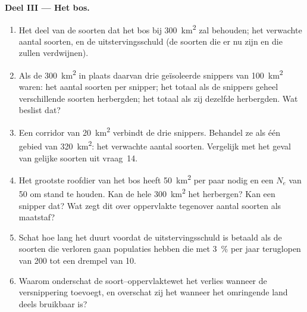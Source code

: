 \begin{problem}
\medskip
\noindent\textbf{Deel III --- Het bos.}
\begin{enumerate}[resume]
  \item Het deel van de soorten dat het bos bij \qty{300}{km^2} zal
        behouden; het verwachte aantal soorten, en de uitstervingsschuld
        (de soorten die er nu zijn en die zullen verdwijnen).
  \item Als de \qty{300}{km^2} in plaats daarvan drie geïsoleerde
        snippers van \qty{100}{km^2} waren: het aantal soorten per
        snipper; het totaal als de snippers geheel verschillende
        soorten herbergden; het totaal als zij dezelfde herbergden. Wat
        beslist dat?
  \item Een corridor van \qty{20}{km^2} verbindt de drie snippers.
        Behandel ze als één gebied van \qty{320}{km^2}: het verwachte
        aantal soorten. Vergelijk met het geval van gelijke soorten uit
        vraag~14.
  \item Het grootste roofdier van het bos heeft \qty{50}{km^2} per paar
        nodig en een $N_{e}$ van 50 om stand te houden. Kan de hele
        \qty{300}{km^2} het herbergen? Kan een snipper dat? Wat zegt dit
        over oppervlakte tegenover aantal soorten als maatstaf?
  \item Schat hoe lang het duurt voordat de uitstervingsschuld is
        betaald als de soorten die verloren gaan populaties hebben die
        met \qty{3}{\%} per jaar teruglopen van 200 tot een drempel van 10.
  \item Waarom onderschat de soort--oppervlaktewet het verlies wanneer
        de versnippering  toevoegt, en overschat zij het
        wanneer het omringende land deels bruikbaar is?
\end{enumerate}


\end{problem}
